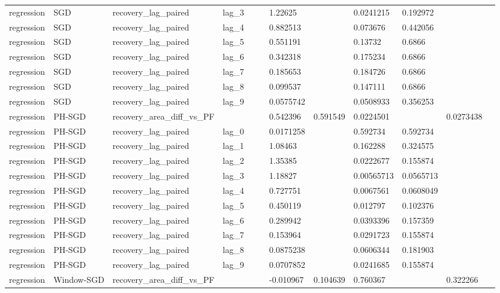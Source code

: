 \begin{tabular}{llllllllllll}
regression & SGD & recovery\_lag\_paired & lag\_3 &  &  & 1.22625 &  & 0.0241215 & 0.192972 &  &  \\
regression & SGD & recovery\_lag\_paired & lag\_4 &  &  & 0.882513 &  & 0.073676 & 0.442056 &  &  \\
regression & SGD & recovery\_lag\_paired & lag\_5 &  &  & 0.551191 &  & 0.13732 & 0.6866 &  &  \\
regression & SGD & recovery\_lag\_paired & lag\_6 &  &  & 0.342318 &  & 0.175234 & 0.6866 &  &  \\
regression & SGD & recovery\_lag\_paired & lag\_7 &  &  & 0.185653 &  & 0.184726 & 0.6866 &  &  \\
regression & SGD & recovery\_lag\_paired & lag\_8 &  &  & 0.099537 &  & 0.147111 & 0.6866 &  &  \\
regression & SGD & recovery\_lag\_paired & lag\_9 &  &  & 0.0575742 &  & 0.0508933 & 0.356253 &  &  \\
regression & PH-SGD & recovery\_area\_diff\_vs\_PF &  &  &  & 0.542396 & 0.591549 & 0.0224501 &  & 0.0273438 &  \\
regression & PH-SGD & recovery\_lag\_paired & lag\_0 &  &  & 0.0171258 &  & 0.592734 & 0.592734 &  &  \\
regression & PH-SGD & recovery\_lag\_paired & lag\_1 &  &  & 1.08463 &  & 0.162288 & 0.324575 &  &  \\
regression & PH-SGD & recovery\_lag\_paired & lag\_2 &  &  & 1.35385 &  & 0.0222677 & 0.155874 &  &  \\
regression & PH-SGD & recovery\_lag\_paired & lag\_3 &  &  & 1.18827 &  & 0.00565713 & 0.0565713 &  &  \\
regression & PH-SGD & recovery\_lag\_paired & lag\_4 &  &  & 0.727751 &  & 0.0067561 & 0.0608049 &  &  \\
regression & PH-SGD & recovery\_lag\_paired & lag\_5 &  &  & 0.450119 &  & 0.012797 & 0.102376 &  &  \\
regression & PH-SGD & recovery\_lag\_paired & lag\_6 &  &  & 0.289942 &  & 0.0393396 & 0.157359 &  &  \\
regression & PH-SGD & recovery\_lag\_paired & lag\_7 &  &  & 0.153964 &  & 0.0291723 & 0.155874 &  &  \\
regression & PH-SGD & recovery\_lag\_paired & lag\_8 &  &  & 0.0875238 &  & 0.0606344 & 0.181903 &  &  \\
regression & PH-SGD & recovery\_lag\_paired & lag\_9 &  &  & 0.0707852 &  & 0.0241685 & 0.155874 &  &  \\
regression & Window-SGD & recovery\_area\_diff\_vs\_PF &  &  &  & -0.010967 & 0.104639 & 0.760367 &  & 0.322266 &  \\

\end{tabular}

